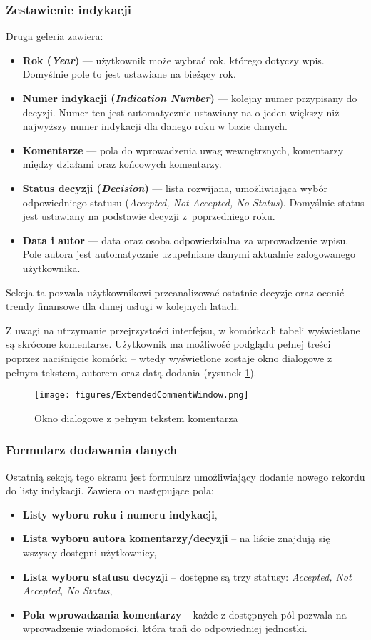 \subsubsection*{Zestawienie indykacji}
Druga geleria zawiera:
\begin{itemize}
    \item \textbf{Rok (\emph{Year})} — użytkownik może wybrać rok, którego dotyczy wpis. Domyślnie pole to jest ustawiane na bieżący rok.
    \item \textbf{Numer indykacji (\emph{Indication Number})} — kolejny numer przypisany do decyzji. Numer ten jest automatycznie ustawiany na o jeden większy niż najwyższy numer indykacji dla danego roku w bazie danych.
    \item \textbf{Komentarze} — pola do wprowadzenia uwag wewnętrznych, komentarzy między działami oraz końcowych komentarzy.
    \item \textbf{Status decyzji (\emph{Decision})} — lista rozwijana, umożliwiająca wybór odpowiedniego statusu (\emph{Accepted, Not Accepted, No Status}). Domyślnie status jest ustawiany na podstawie decyzji z~poprzedniego roku.
    \item \textbf{Data i autor} — data oraz osoba odpowiedzialna za wprowadzenie wpisu. Pole autora jest automatycznie uzupełniane danymi aktualnie zalogowanego użytkownika.
\end{itemize}
Sekcja ta pozwala użytkownikowi przeanalizować ostatnie decyzje oraz ocenić trendy finansowe dla danej usługi w kolejnych latach.

Z uwagi na utrzymanie przejrzystości interfejsu, w komórkach tabeli wyświetlane są skrócone komentarze. Użytkownik ma możliwość podglądu pełnej treści poprzez naciśnięcie komórki -- wtedy wyświetlone zostaje okno dialogowe z pełnym tekstem, autorem oraz datą dodania (rysunek \ref{fig:extendedcommentwindow}).

\begin{figure}[H]
    \centering
    \texttt{[image: figures/ExtendedCommentWindow.png]}
    \caption{Okno dialogowe z pełnym tekstem komentarza}
    \label{fig:extendedcommentwindow}
\end{figure}


\subsubsection*{Formularz dodawania danych}
Ostatnią sekcją tego ekranu jest formularz umożliwiający dodanie nowego rekordu do listy indykacji. Zawiera on następujące pola:
\begin{itemize}
    \item \textbf{Listy wyboru roku i numeru indykacji},
    \item \textbf{Lista wyboru autora komentarzy/decyzji} -- na liście znajdują się wszyscy dostępni użytkownicy,
    \item \textbf{Lista wyboru statusu decyzji} -- dostępne są trzy statusy: \emph{Accepted, Not Accepted, No Status},
    \item \textbf{Pola wprowadzania komentarzy} -- każde z dostępnych pól pozwala na wprowadzenie wiadomości, która trafi do odpowiedniej jednostki.
\end{itemize}

